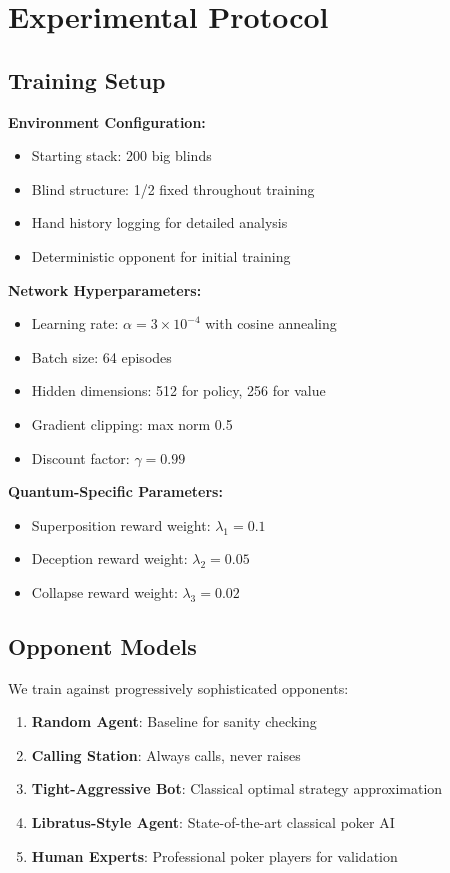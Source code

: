 \documentclass[11pt,a4paper]{article}
\begin{document}
\section{Experimental Protocol}

\subsection{Training Setup}

\textbf{Environment Configuration:}
\begin{itemize}
\item Starting stack: 200 big blinds
\item Blind structure: 1/2 fixed throughout training
\item Hand history logging for detailed analysis
\item Deterministic opponent for initial training
\end{itemize}

\textbf{Network Hyperparameters:}
\begin{itemize}
\item Learning rate: $\alpha = 3 \times 10^{-4}$ with cosine annealing
\item Batch size: 64 episodes
\item Hidden dimensions: 512 for policy, 256 for value
\item Gradient clipping: max norm 0.5
\item Discount factor: $\gamma = 0.99$
\end{itemize}

\textbf{Quantum-Specific Parameters:}
\begin{itemize}
\item Superposition reward weight: $\lambda_1 = 0.1$
\item Deception reward weight: $\lambda_2 = 0.05$
\item Collapse reward weight: $\lambda_3 = 0.02$
\end{itemize}

\subsection{Opponent Models}

We train against progressively sophisticated opponents:

\begin{enumerate}
\item \textbf{Random Agent}: Baseline for sanity checking
\item \textbf{Calling Station}: Always calls, never raises
\item \textbf{Tight-Aggressive Bot}: Classical optimal strategy approximation
\item \textbf{Libratus-Style Agent}: State-of-the-art classical poker AI
\item \textbf{Human Experts}: Professional poker players for validation
\end{enumerate}
\end{document}
